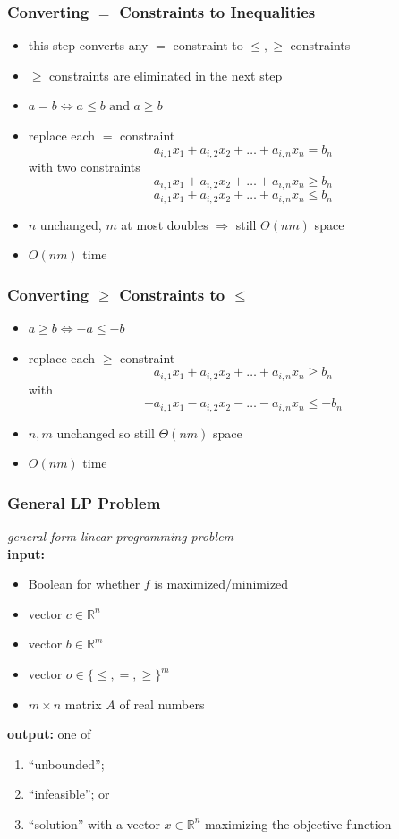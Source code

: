 \documentclass{beamer}
\begin{document}
\begin{frame} \frametitle{Converting $=$ Constraints to Inequalities}
  \begin{itemize}
    \item this step converts any $=$ constraint to $\leq, \geq$ constraints
    \item $\geq$ constraints are eliminated in the next step
    \item $a = b \Longleftrightarrow a \leq b \text{ and } a \geq b$
    \item replace each $=$ constraint
    \[ a_{i, 1} x_1 + a_{i, 2} x_2 + \ldots + a_{i, n} x_n = b_n \]
    with two constraints
    \[ a_{i, 1} x_1 + a_{i, 2} x_2 + \ldots + a_{i, n} x_n \geq b_n \]
    \[ a_{i, 1} x_1 + a_{i, 2} x_2 + \ldots + a_{i, n} x_n \leq b_n \]
    \item $n$ unchanged, $m$ at most doubles $\Rightarrow$ still $\Theta(nm)$ space
    \item $O(nm)$ time
  \end{itemize}
\end{frame}

\begin{frame} \frametitle{Converting $\geq$ Constraints to $\leq$}
  \begin{itemize}
    \item $a \geq b \Longleftrightarrow -a \leq -b$
    \item replace each $\geq$ constraint
    \[ a_{i, 1} x_1 + a_{i, 2} x_2 + \ldots + a_{i, n} x_n \geq b_n \]
    with
    \[ -a_{i, 1} x_1 - a_{i, 2} x_2 - \ldots - a_{i, n} x_n \leq -b_n \]
    \item $n, m$ unchanged so still $\Theta(nm)$ space
    \item $O(nm)$ time
\end{itemize}
\end{frame}

\begin{frame} \frametitle{General LP Problem}
  \emph{general-form linear programming problem} \\
  \textbf{input:}
  \begin{itemize}
    \item Boolean for whether $f$ is maximized/minimized
    \item vector $c \in \mathbb{R}^n$
    \item vector $b \in \mathbb{R}^m$
    \item vector $o \in \{\leq, =, \geq\}^m$
    \item $m \times n$ matrix $A$ of real numbers
  \end{itemize}
  \textbf{output:} one of
  \begin{enumerate}
    \item ``unbounded'';
    \item ``infeasible''; or
    \item ``solution'' with a vector $x \in \mathbb{R}^n$
      maximizing the objective function
  \end{enumerate}
\end{frame}
\end{document}
